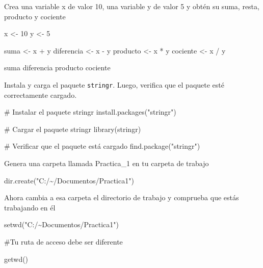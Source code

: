 \documentclass[
  letterpaper,
  DIV=11,
  numbers=noendperiod]{scrreprt}
\newenvironment{Shaded}{\begin{snugshade}}{\end{snugshade}}
\newcommand{\CommentTok}[1]{\textcolor[rgb]{0.37,0.37,0.37}{#1}}
\newcommand{\DecValTok}[1]{\textcolor[rgb]{0.68,0.00,0.00}{#1}}
\newcommand{\FunctionTok}[1]{\textcolor[rgb]{0.28,0.35,0.67}{#1}}
\newcommand{\NormalTok}[1]{\textcolor[rgb]{0.00,0.23,0.31}{#1}}
\newcommand{\OtherTok}[1]{\textcolor[rgb]{0.00,0.23,0.31}{#1}}
\newcommand{\SpecialCharTok}[1]{\textcolor[rgb]{0.37,0.37,0.37}{#1}}
\newcommand{\StringTok}[1]{\textcolor[rgb]{0.13,0.47,0.30}{#1}}
\begin{document}
Crea una variable x de valor 10, una variable y de valor 5 y obtén su
suma, resta, producto y cociente

\begin{Shaded}
\begin{Highlighting}[]
\NormalTok{x }\OtherTok{\textless{}{-}} \DecValTok{10}
\NormalTok{y }\OtherTok{\textless{}{-}} \DecValTok{5}

\NormalTok{suma }\OtherTok{\textless{}{-}}\NormalTok{ x }\SpecialCharTok{+}\NormalTok{ y}
\NormalTok{diferencia }\OtherTok{\textless{}{-}}\NormalTok{ x }\SpecialCharTok{{-}}\NormalTok{ y}
\NormalTok{producto }\OtherTok{\textless{}{-}}\NormalTok{ x }\SpecialCharTok{*}\NormalTok{ y}
\NormalTok{cociente }\OtherTok{\textless{}{-}}\NormalTok{ x }\SpecialCharTok{/}\NormalTok{ y}

\NormalTok{suma }
\NormalTok{diferencia}
\NormalTok{producto }
\NormalTok{cociente }
\end{Highlighting}
\end{Shaded}

Instala y carga el paquete \texttt{stringr}. Luego, verifica que el
paquete esté correctamente cargado.

\begin{Shaded}
\begin{Highlighting}[]
\CommentTok{\# Instalar el paquete stringr }
\FunctionTok{install.packages}\NormalTok{(}\StringTok{"stringr"}\NormalTok{)}

\CommentTok{\# Cargar el paquete stringr}
\FunctionTok{library}\NormalTok{(stringr)}

\CommentTok{\# Verificar que el paquete está cargado}
\FunctionTok{find.package}\NormalTok{(}\StringTok{"stringr"}\NormalTok{)}
\end{Highlighting}
\end{Shaded}

Genera una carpeta llamada Practica\_1 en tu carpeta de trabajo

\begin{Shaded}
\begin{Highlighting}[]
\FunctionTok{dir.create}\NormalTok{(}\StringTok{"C:/\textasciitilde{}/Documentos/Practica1"}\NormalTok{)}
\end{Highlighting}
\end{Shaded}

Ahora cambia a esa carpeta el directorio de trabajo y comprueba que
estás trabajando en él

\begin{Shaded}
\begin{Highlighting}[]
\FunctionTok{setwd}\NormalTok{(}\StringTok{"C:/\textasciitilde{}Documentos/Practica1"}\NormalTok{)}

\CommentTok{\#Tu ruta de acceso debe ser diferente}

\FunctionTok{getwd}\NormalTok{()}
\end{Highlighting}
\end{Shaded}
\end{document}
